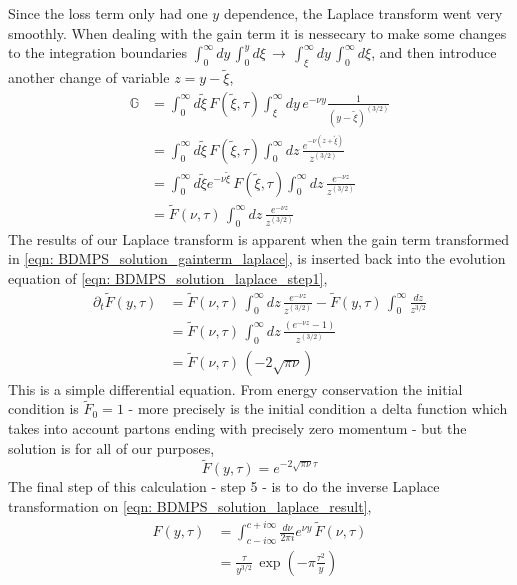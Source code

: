 \documentclass[main.tex]{subfiles}
\begin{document}
Since the loss term only had one \(y\) dependence, the Laplace transform went very smoothly. When dealing with the gain term it is nessecary to make some changes to the integration boundaries \(\int_0^\infty dy\, \int_0^y d\xi \,\rightarrow\, \int_\xi^\infty dy\, \int_0^\infty d\xi\), and then introduce another change of variable \(z = y-\tilde{\xi}\),
\begin{align}\label{eqn: BDMPS_solution_gainterm_laplace}
    \mathbb{G} &= \int_0^{\infty} d\tilde{\xi} \,F(\tilde{\xi}, \tau) \int_\xi^\infty dy\,  e^{-\nu y} \frac{1}{(y-\tilde{\xi})^{(3/2)}} \nonumber \\
    &= \int_0^{\infty} d\tilde{\xi} \,F(\tilde{\xi}, \tau) \int_0^\infty dz\, \frac{e^{-\nu (z+\tilde{\xi})}}{z^{(3/2)}} \nonumber \\
    &= \int_0^{\infty} d\tilde{\xi} e^{-\nu \tilde{\xi}} \,F(\tilde{\xi}, \tau) \int_0^\infty dz\, \frac{e^{-\nu z}}{z^{(3/2)}} \nonumber \\
    &= \tilde{F}(\nu, \tau) \, \int_0^\infty dz\, \frac{e^{-\nu z}}{z^{(3/2)}} 
\end{align}
The results of our Laplace transform is apparent when the gain term transformed in \autoref{eqn: BDMPS_solution_gainterm_laplace}, is inserted back into the evolution equation of \autoref{eqn: BDMPS_solution_laplace_step1}, 
\begin{align}\label{eqn: BDMPS_solution_laplace_step2}
    \partial_t \tilde{F}(y,\tau) &= \tilde{F}(\nu, \tau) \, \int_0^\infty dz\, \frac{e^{-\nu z}}{z^{(3/2)}} - \tilde{F}(y,\tau) \, \int_0^\infty \frac{dz}{z^{3/2}} \nonumber \\
    &= \tilde{F}(\nu, \tau) \, \int_0^\infty dz\, \frac{(e^{-\nu z}-1)}{z^{(3/2)}} \nonumber \\
    &= \tilde{F}(\nu, \tau) \, (-2 \sqrt{\pi \nu})
\end{align}
This is a simple differential equation. From energy conservation the initial condition is \(\tilde{F}_0 = 1\) - more precisely is the initial condition a delta function which takes into account partons ending with precisely zero momentum - but the solution is for all of our purposes, 
\begin{equation}\label{eqn: BDMPS_solution_laplace_result}
    \tilde{F}(y,\tau) = e^{-2\sqrt{\pi \nu}\tau}
\end{equation}
The final step of this calculation - step 5 - is to do the inverse Laplace transformation on \autoref{eqn: BDMPS_solution_laplace_result},
\begin{align}
    F(y,\tau) &= \int_{c-i\infty}^{c+i\infty} \frac{d\nu}{2\pi i} e^{\nu y} \,\tilde{F}(\nu,\tau) \nonumber \\
    &= \frac{\tau}{y^{3/2}} \, \exp\left(-\pi \frac{\tau^2}{y}\right)
\end{align}
\end{document}
